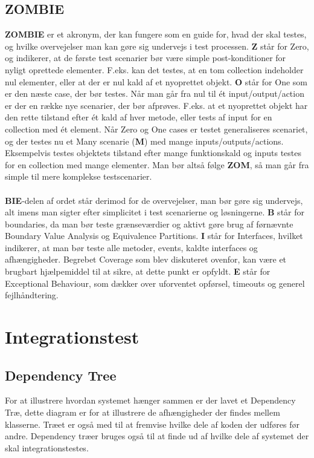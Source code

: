 \documentclass[a4paper,12pt,fleqn,oneside]{article}
\begin{document}
\subsection{ZOMBIE}
\textbf{ZOMBIE} er et akronym, der kan fungere som en guide for, hvad der skal testes, og hvilke overvejelser man kan gøre sig undervejs i test processen. \textbf{Z} står for Zero, og indikerer, at de første test scenarier bør være simple post-konditioner for nyligt oprettede elementer. F.eks. kan det testes, at en tom collection indeholder nul elementer, eller at der er nul kald af et nyoprettet objekt. \textbf{O} står for One som er den næste case, der bør testes. Når man går fra nul til ét input/output/action er der en række nye scenarier, der bør afprøves. F.eks. at et nyoprettet objekt har den rette tilstand efter ét kald af hver metode, eller tests af input for en collection med ét element. Når Zero og One cases er testet generaliseres scenariet, og der testes nu et Many scenarie (\textbf{M}) med mange inputs/outputs/actions. Eksempelvis testes objektets tilstand efter mange funktionskald og inputs testes for en collection med mange elementer. Man bør altså følge \textbf{ZOM}, så man går fra simple til mere komplekse testscenarier. \\\\\textbf{BIE}-delen af ordet står derimod for de overvejelser, man bør gøre sig undervejs, alt imens man sigter efter simplicitet i test scenarierne og løsningerne. \textbf{B} står for boundaries, da man bør teste grænseværdier og aktivt gøre brug af førnævnte Boundary Value Analysis og Equivalence Partitions. \textbf{I} står for Interfaces, hvilket indikerer, at man bør teste alle metoder, events, kaldte interfaces og afhængigheder. Begrebet Coverage som blev diskuteret ovenfor, kan være et brugbart hjælpemiddel til at sikre, at dette punkt er opfyldt. \textbf{E} står for Exceptional Behaviour, som dækker over uforventet opførsel, timeouts og generel fejlhåndtering. 

\section{Integrationstest}

\subsection{Dependency Tree}

For at illustrere hvordan systemet hænger sammen er der lavet et Dependency Træ, dette diagram er for at illustrere de afhængigheder der findes mellem klasserne. Træet er også med til at fremvise hvilke dele af koden der udføres før andre. Dependency træer bruges også til at finde ud af hvilke dele af systemet der skal integrationstestes.
\end{document}
